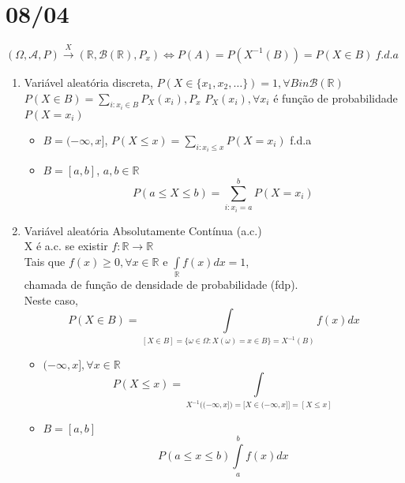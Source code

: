 \documentclass[a4paper,12pt]{article}
\begin{document}
\newpage
\section*{08/04}

$(\Omega,\mathscr{A},P) \overset{X}{\longrightarrow}(\mathbb{R},\mathscr{B}(\mathbb{R}),P_x) \Leftrightarrow P(A)=P(X^{-1}(B))=P(X\in B)\ f.d.a $ 

\begin{enumerate}
	\item  Variável aleatória discreta, $P(X\in \{x_1,x_2,\ldots\})=1,\forall B in \mathscr{B}(\mathbb{R}) \,$\\
$P(X\in B)= \sum\limits_{i: x_i\in B}P_X(x_i), P_x $ $P_X(x_i), \forall x_i $ é função de probabilidade $P(X=x_i)$

\begin{itemize}
	\item $ B=(-\infty,x]$, $P(X\le x)=\sum\limits_{i:x_i\le x} P(X=x_i)$ f.d.a
	\item $B=[a,b]$,  $a,b\in\mathbb R$
	$$P(a\le X\le b)=\sum\limits_{i:x_i=a}^{b}P(X=x_i) $$
\end{itemize}

\item Variável aleatória Absolutamente Contínua (a.c.)\\
X é a.c. se existir $f:\mathbb R \longrightarrow \mathbb R$\\
Tais que $f(x)\ge0, \forall x\in \mathbb R$ e $\int\limits_{\mathbb R} f(x)dx=1$,\\
chamada de função de densidade de probabilidade (fdp).\\
Neste caso,
$$P(X\in B)=\int\limits_{[X\in B]=\{\omega \in \Omega: X(\omega)=x\in B \}=X^{-1}(B)} f(x)dx  $$
\begin{itemize}
	\item $(-\infty,x], \forall x \in \mathbb R$
	$$P(X\le x) = \int\limits_{X^{-1}\bigg((-\infty,x]\bigg) = \bigg[X\in (-\infty,x]\bigg]=[X\le x]} $$
	
	\item $B=[a,b]$
	$$P(a\le x\le b)\int\limits_{a}^{b} f(x)dx$$
\end{itemize}
\end{enumerate}
\end{document}
